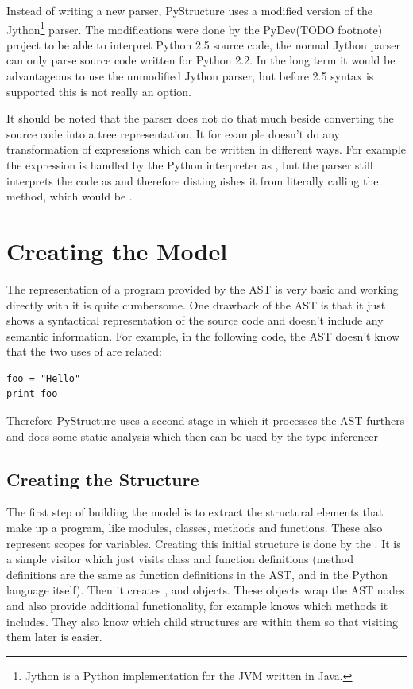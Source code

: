 \documentclass[12pt,halfparskip]{scrreprt}
\begin{document}
Instead of writing a new parser, PyStructure uses a modified version of the Jython\footnote{Jython is a Python implementation for the JVM written in Java.} parser. The modifications were done by the PyDev(TODO footnote) project to be able to interpret Python 2.5 source code, the normal Jython parser can only parse source code written for Python 2.2. In the long term it would be advantageous to use the unmodified Jython parser, but before 2.5 syntax is supported this is not really an option.


It should be noted that the parser does not do that much beside converting the source code into a tree representation. It for example doesn't do any transformation of expressions which can be written in different ways. For example the expression  is handled by the Python interpreter as , but the parser still interprets the code as  and therefore distinguishes it from literally calling the  method, which would be . 

\section{Creating the Model}



The representation of a program provided by the AST is very basic and working directly with it is quite cumbersome. 
One drawback of the AST is that it just shows a syntactical representation of the source code and doesn't include any semantic information. For example, in the following code, the AST doesn't know that the two uses of  are related:

\begin{lstlisting}
foo = "Hello"
print foo
\end{lstlisting}

Therefore PyStructure uses a second stage in which it processes the AST furthers and does some static analysis which then can be used by the type inferencer


\subsection{Creating the Structure}

The first step of building the model is to extract the structural elements that make up a program, like modules, classes, methods and functions. These also represent scopes for variables. Creating this initial structure is done by the . It is a simple visitor which just visits class and function definitions (method definitions are the same as function definitions in the AST, and in the Python language itself). Then it creates ,  and  objects. These objects wrap the AST nodes and also provide additional functionality, for example  knows which methods it includes. They also know which child structures are within them so that visiting them later is easier.
\end{document}
